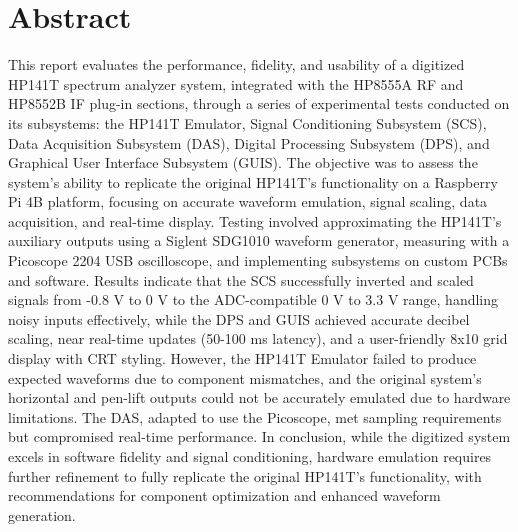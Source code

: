 \documentclass[class=report,11pt,crop=false]{standalone}
\begin{document}
\chapter*{Abstract}


This report evaluates the performance, fidelity, and usability of a digitized HP141T spectrum analyzer system, integrated with the HP8555A RF and HP8552B IF plug-in sections, through a series of experimental tests conducted on its subsystems: the HP141T Emulator, Signal Conditioning Subsystem (SCS), Data Acquisition Subsystem (DAS), Digital Processing Subsystem (DPS), and Graphical User Interface Subsystem (GUIS). The objective was to assess the system's ability to replicate the original HP141T's functionality on a Raspberry Pi 4B platform, focusing on accurate waveform emulation, signal scaling, data acquisition, and real-time display. Testing involved approximating the HP141T's auxiliary outputs using a Siglent SDG1010 waveform generator, measuring with a Picoscope 2204 USB oscilloscope, and implementing subsystems on custom PCBs and software. Results indicate that the SCS successfully inverted and scaled signals from -0.8 V to 0 V to the ADC-compatible 0 V to 3.3 V range, handling noisy inputs effectively, while the DPS and GUIS achieved accurate decibel scaling, near real-time updates (50-100 ms latency), and a user-friendly 8x10 grid display with CRT styling. However, the HP141T Emulator failed to produce expected waveforms due to component mismatches, and the original system's horizontal and pen-lift outputs could not be accurately emulated due to hardware limitations. The DAS, adapted to use the Picoscope, met sampling requirements but compromised real-time performance. In conclusion, while the digitized system excels in software fidelity and signal conditioning, hardware emulation requires further refinement to fully replicate the original HP141T's functionality, with recommendations for component optimization and enhanced waveform generation.
	
\ifstandalone
% 
\fi
\end{document}
